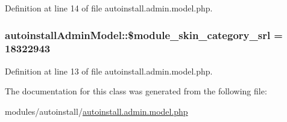 Definition at line 14 of file autoinstall.\+admin.\+model.\+php.

\hypertarget{classautoinstallAdminModel_ad9e023f5b4f464ba2cbea5465d05ef69}{}
\subsubsection[{\$module\+\_\+skin\+\_\+category\+\_\+srl}]{\setlength{\rightskip}{0pt plus 5cm}autoinstall\+Admin\+Model\+::\$module\+\_\+skin\+\_\+category\+\_\+srl = 18322943}\label{classautoinstallAdminModel_ad9e023f5b4f464ba2cbea5465d05ef69}


Definition at line 13 of file autoinstall.\+admin.\+model.\+php.



The documentation for this class was generated from the following file\+:\begin{DoxyCompactItemize}
\item 
modules/autoinstall/\hyperlink{autoinstall_8admin_8model_8php}{autoinstall.\+admin.\+model.\+php}\end{DoxyCompactItemize}
